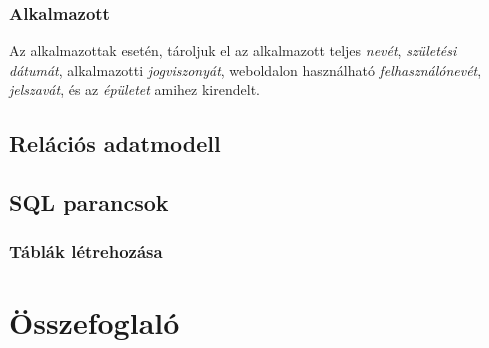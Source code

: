 \documentclass[a4paper,12pt]{article}
\begin{document}
\subsubsection*{Alkalmazott}
Az alkalmazottak esetén, tároljuk el az alkalmazott teljes \textit{nevét}, \textit{születési dátumát}, alkalmazotti \textit{jogviszonyát}, weboldalon használható \textit{felhasználónevét}, \textit{jelszavát}, és az \textit{épületet} amihez kirendelt.


\subsection{Relációs adatmodell}
\subsection{SQL parancsok}
\subsubsection{Táblák létrehozása}
\section{Összefoglaló}
\end{document}
